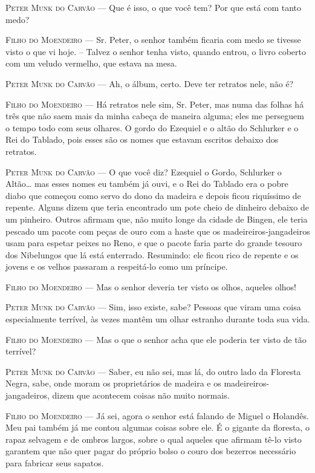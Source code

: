 \begin{myparindent}{0pt}
\begin{Parskip}
\textsc{Peter Munk do Carvão} --- Que é isso, o que você tem? Por que está com
tanto medo?

\textsc{Filho do Moendeiro} --- Sr. Peter, o senhor também ficaria com medo se
tivesse visto o que vi hoje. -- Talvez o senhor tenha visto, quando
entrou, o livro coberto com um veludo vermelho, que estava na mesa.

\textsc{Peter Munk do Carvão} --- Ah, o álbum, certo. Deve ter retratos nele, não
é?

\textsc{Filho do Moendeiro} --- Há retratos nele sim, Sr. Peter, mas numa das
folhas há três que não saem mais da minha cabeça de maneira alguma; eles
me perseguem o tempo todo com seus olhares. O gordo do Ezequiel e o
altão do Schlurker e o Rei do Tablado, pois esses são os nomes que
estavam escritos debaixo dos retratos.

\textsc{Peter Munk do Carvão} --- O que você diz? Ezequiel o Gordo, Schlurker o
Altão\ldots{} mas esses nomes eu também já ouvi, e o Rei do Tablado era o
pobre diabo que começou como servo do dono da madeira e depois ficou
riquíssimo de repente. Alguns dizem que teria encontrado um pote cheio
de dinheiro debaixo de um pinheiro. Outros afirmam que, não muito longe
da cidade de Bingen, ele teria pescado um pacote com peças de ouro com a
haste que os madeireiros-jangadeiros usam para espetar peixes no Reno, e
que o pacote faria parte do grande tesouro dos Nibelungos que lá está
enterrado. Resumindo: ele ficou rico de repente e os jovens e os velhos
passaram a respeitá-lo como um príncipe.

\textsc{Filho do Moendeiro} --- Mas o senhor deveria ter visto os olhos, aqueles
olhos!

\textsc{Peter Munk do Carvão} --- Sim, isso existe, sabe? Pessoas que viram uma
coisa especialmente terrível, às vezes mantêm um olhar estranho durante
toda sua vida.

\textsc{Filho do Moendeiro} --- Mas o que o senhor acha que ele poderia ter visto
de tão terrível?

\textsc{Peter Munk do Carvão} --- Saber, eu não sei, mas lá, do outro lado da
Floresta Negra, sabe, onde moram os proprietários de madeira e os
madeireiros-jangadeiros, dizem que acontecem coisas não muito normais.

\textsc{Filho do Moendeiro} --- Já sei, agora o senhor está falando de Miguel o
Holandês. Meu pai também já me contou algumas coisas sobre ele. É o
gigante da floresta, o rapaz selvagem e de ombros largos, sobre o qual
aqueles que afirmam tê-lo visto garantem que não quer pagar do próprio
bolso o couro dos bezerros necessário para fabricar seus sapatos.


\end{Parskip}
\end{myparindent}
